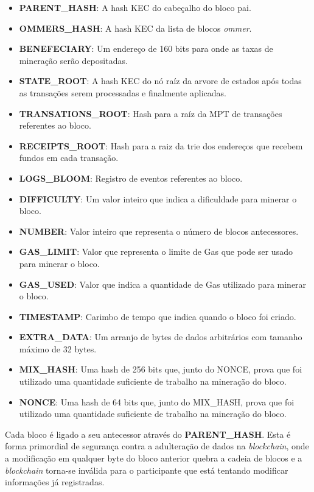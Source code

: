 \documentclass[tcc,capa]{texufpel}
\begin{document}
	\begin{itemize}
	    \item \textbf{PARENT\_HASH}: A hash KEC do cabeçalho do bloco pai.
	    \item \textbf{OMMERS\_HASH}: A hash KEC da lista de blocos \textit{ommer}.
	    \item \textbf{BENEFECIARY}: Um endereço de 160 bits para onde as taxas de mineração serão depositadas.
	    \item \textbf{STATE\_ROOT}: A hash KEC do nó raíz da arvore de estados após todas as transações serem processadas e finalmente aplicadas.
	    \item \textbf{TRANSATIONS\_ROOT}: Hash para a raíz da MPT de transações referentes ao bloco.
	    \item \textbf{RECEIPTS\_ROOT}: Hash para a raiz da trie dos endereços que recebem fundos em cada transação.
	    \item \textbf{LOGS\_BLOOM}: Registro de eventos referentes ao bloco.
	    \item \textbf{DIFFICULTY}: Um valor inteiro que indica a dificuldade para minerar o bloco.
	    \item \textbf{NUMBER}: Valor inteiro que representa o número de blocos antecessores.
	    \item \textbf{GAS\_LIMIT}: Valor que representa o limite de Gas que pode ser usado para minerar o bloco.
	    \item \textbf{GAS\_USED}: Valor que indica a quantidade de Gas utilizado para minerar o bloco.
	    \item \textbf{TIMESTAMP}: Carimbo de tempo que indica quando o bloco foi criado.
	    \item \textbf{EXTRA\_DATA}: Um arranjo de bytes de dados arbitrários com tamanho máximo de 32 bytes.
	    \item \textbf{MIX\_HASH}: Uma hash de 256 bits que, junto do NONCE, prova que foi utilizado uma quantidade suficiente de trabalho na mineração do bloco.
	    \item \textbf{NONCE}: Uma hash de 64 bits que, junto do MIX\_HASH, prova que foi utilizado uma quantidade suficiente de trabalho na mineração do bloco.
	\end{itemize}
	
	Cada bloco é ligado a seu antecessor através do \textbf{PARENT\_HASH}. Esta é forma primordial de segurança contra a adulteração de dados na \textit{blockchain}, onde a modificação em qualquer byte do bloco anterior quebra a cadeia de blocos e a \textit{blockchain} torna-se inválida para o participante que está tentando modificar informações já registradas.
	
\end{document}
